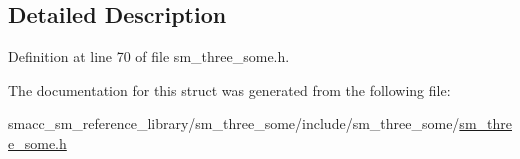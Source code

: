 \subsection{Detailed Description}


Definition at line 70 of file sm\+\_\+three\+\_\+some.\+h.



The documentation for this struct was generated from the following file\+:\begin{DoxyCompactItemize}
\item 
smacc\+\_\+sm\+\_\+reference\+\_\+library/sm\+\_\+three\+\_\+some/include/sm\+\_\+three\+\_\+some/\hyperlink{sm__three__some_8h}{sm\+\_\+three\+\_\+some.\+h}\end{DoxyCompactItemize}
